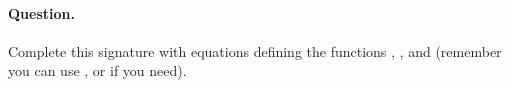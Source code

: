 \paragraph{Question.} Complete this signature with equations defining
the functions \textbf{}, \textbf{},
\textbf{} and \textbf{} (remember you can use
,  or  if you need).
